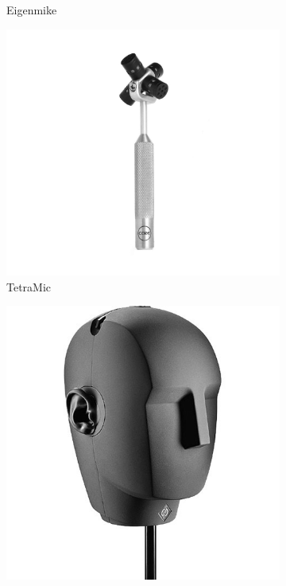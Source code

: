 \begin{figure}[t]
\begin{subfigure}[b]{0.3\textwidth}
        \caption{Eigenmike}
        \label{fig:01_Introduction:Eigenmike}
    \end{subfigure}
    \hfill
    \begin{subfigure}[b]{0.3\textwidth}
        \includegraphics[width=\textwidth,trim={12cm 2cm 12cm 2cm},clip]{01_introduction/images/tetramic_bw.jpg}
        \caption{TetraMic}
        \label{fig:01_Introduction:TetraMic}
    \end{subfigure}
    \hfill
    \begin{subfigure}[b]{0.3\textwidth}
        \includegraphics[width=\textwidth,trim={3cm 0 3cm 0},clip]{01_introduction/images/ku100_bw.jpg}

\end{subfigure}
\end{figure}
